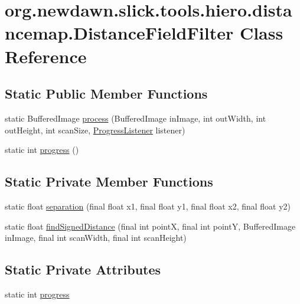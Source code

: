 \hypertarget{classorg_1_1newdawn_1_1slick_1_1tools_1_1hiero_1_1distancemap_1_1_distance_field_filter}{}\section{org.\+newdawn.\+slick.\+tools.\+hiero.\+distancemap.\+Distance\+Field\+Filter Class Reference}
\label{classorg_1_1newdawn_1_1slick_1_1tools_1_1hiero_1_1distancemap_1_1_distance_field_filter}
\subsection*{Static Public Member Functions}
\begin{DoxyCompactItemize}
\item 
static Buffered\+Image \mbox{\hyperlink{classorg_1_1newdawn_1_1slick_1_1tools_1_1hiero_1_1distancemap_1_1_distance_field_filter_aef9a297ea02c10dadb6325423186f832}{process}} (Buffered\+Image in\+Image, int out\+Width, int out\+Height, int scan\+Size, \mbox{\hyperlink{interfaceorg_1_1newdawn_1_1slick_1_1tools_1_1hiero_1_1_progress_listener}{Progress\+Listener}} listener)
\item 
static int \mbox{\hyperlink{classorg_1_1newdawn_1_1slick_1_1tools_1_1hiero_1_1distancemap_1_1_distance_field_filter_aa00f09a7d2e13879b1434ed53aea0eef}{progress}} ()
\end{DoxyCompactItemize}
\subsection*{Static Private Member Functions}
\begin{DoxyCompactItemize}
\item 
static float \mbox{\hyperlink{classorg_1_1newdawn_1_1slick_1_1tools_1_1hiero_1_1distancemap_1_1_distance_field_filter_a22ed8f3b6d1c38791056d8a063d85452}{separation}} (final float x1, final float y1, final float x2, final float y2)
\item 
static float \mbox{\hyperlink{classorg_1_1newdawn_1_1slick_1_1tools_1_1hiero_1_1distancemap_1_1_distance_field_filter_a1db145606e5aad5d9d2007a8fe07a19d}{find\+Signed\+Distance}} (final int pointX, final int pointY, Buffered\+Image in\+Image, final int scan\+Width, final int scan\+Height)
\end{DoxyCompactItemize}
\subsection*{Static Private Attributes}
\begin{DoxyCompactItemize}
\item 
static int \mbox{\hyperlink{classorg_1_1newdawn_1_1slick_1_1tools_1_1hiero_1_1distancemap_1_1_distance_field_filter_ad0847cf76175019f672f40085ba85d2d}{progress}}
\end{DoxyCompactItemize}


